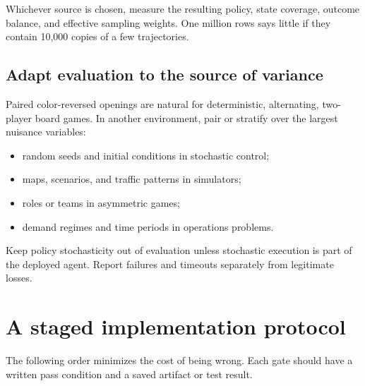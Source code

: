 \documentclass[10.5pt,letterpaper]{article}
\begin{document}
Whichever source is chosen, measure the resulting policy, state coverage,
outcome balance, and effective sampling weights. One million rows says little
if they contain 10,000 copies of a few trajectories.

\subsection{Adapt evaluation to the source of variance}

Paired color-reversed openings are natural for deterministic, alternating,
two-player board games. In another environment, pair or stratify over the
largest nuisance variables:
\begin{itemize}
  \item random seeds and initial conditions in stochastic control;
  \item maps, scenarios, and traffic patterns in simulators;
  \item roles or teams in asymmetric games;
  \item demand regimes and time periods in operations problems.
\end{itemize}

Keep policy stochasticity out of evaluation unless stochastic execution is part
of the deployed agent. Report failures and timeouts separately from legitimate
losses.

\section{A staged implementation protocol}

The following order minimizes the cost of being wrong. Each gate should have a
written pass condition and a saved artifact or test result.
\end{document}
